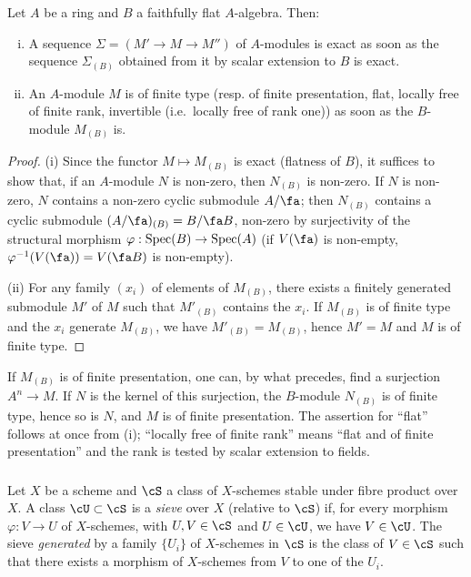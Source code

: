 \begin{proposition}\label{I:1-4-2}
Let $A$ be a ring and $B$ a faithfully flat $A$-algebra. Then:
\begin{enumerate}[(i)]
  \item A sequence $\Sigma=(M'\to M\to M'')$ of $A$-modules is exact as soon
    as the sequence $\Sigma_{(B)}$ obtained from it by scalar extension
    to $B$ is exact.
  \item An $A$-module $M$ is of finite type (resp. of finite presentation,
    flat, locally free of finite rank, invertible (i.e.\ locally free
    of rank one)) as soon as the $B$-module $M_{(B)}$ is.
\end{enumerate}
\end{proposition}
\begin{proof}
(i) Since the functor $M\mapsto M_{(B)}$ is exact (flatness of $B$), it suffices
to show that, if an $A$-module $N$ is non-zero, then $N_{(B)}$ is non-zero. If
$N$ is non-zero, $N$ contains a non-zero cyclic submodule $A/\fa$; then
$N_{(B)}$ contains a cyclic submodule $(A/\fa)_{(B)} = B/\fa B$, non-zero
by surjectivity of the structural morphism $\varphi:\operatorname{Spec}(B)\to\operatorname{Spec}(A)$ (if
$V(\fa)$ is non-empty, $\varphi^{-1}(V(\fa))=V(\fa B)$ is non-empty).

(ii) For any family $(x_i)$ of elements of $M_{(B)}$, there exists a
finitely generated submodule $M'$ of $M$ such that $M'_{(B)}$ contains the $x_i$. If
$M_{(B)}$ is of finite type and the $x_i$ generate $M_{(B)}$, we have
$M'_{(B)}=M_{(B)}$, hence $M'=M$ and $M$ is of finite type.
\end{proof}

If $M_{(B)}$ is of finite presentation, one can, by what precedes,
find a surjection $A^n\to M$. If $N$ is the kernel of this surjection, the
$B$-module $N_{(B)}$ is of finite type, hence so is $N$, and $M$ is of
finite presentation. The assertion for ``flat'' follows at once from (i);
``locally free of finite rank'' means ``flat and of finite presentation''
and the rank is tested by scalar extension to fields.





\subsubsection{}\label{I:1-4-3}

Let $X$ be a scheme and $\cS$ a class of $X$-schemes stable under fibre
product over $X$. A class $\cU\subset \cS$ is a \emph{sieve} over $X$
(relative to $\cS$) if, for every morphism $\varphi:V\to U$ of
$X$-schemes, with $U,V\in \cS$ and $U\in\cU$, we have $V\in \cU$. The sieve
\emph{generated} by a family $\{U_i\}$ of $X$-schemes in $\cS$ is the
class of $V\in\cS$ such that there exists a morphism of $X$-schemes from $V$ to
one of the $U_i$. 







